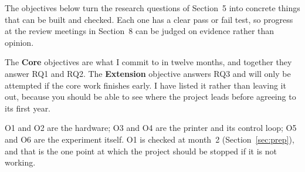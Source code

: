 \documentclass[11pt,a4paper]{article}
\begin{document}
The objectives below turn the research questions of Section~5 into concrete things
that can be built and checked. Each one has a clear pass or fail test, so progress
at the review meetings in Section~8 can be judged on evidence rather than
opinion.

The \textbf{Core} objectives are what I commit to in twelve months, and together
they answer RQ1 and RQ2. The \textbf{Extension} objective answers RQ3 and will
only be attempted if the core work finishes early. I have listed it rather than
leaving it out, because you should be able to see where the project leads before
agreeing to its first year.

O1 and O2 are the hardware; O3 and O4 are the printer and its control loop; O5 and
O6 are the experiment itself. O1 is checked at month~2 (Section~\ref{sec:prep}), and that is
the one point at which the project should be stopped if it is not working.
\end{document}
